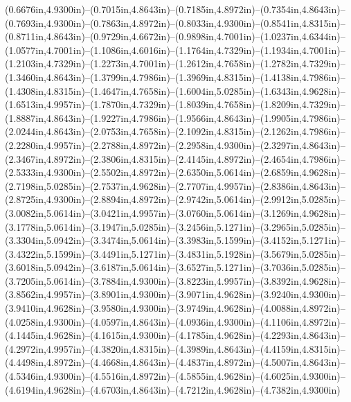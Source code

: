 (0.6676in,4.9300in)--(0.7015in,4.8643in)--(0.7185in,4.8972in)--(0.7354in,4.8643in)--(0.7693in,4.9300in)--(0.7863in,4.8972in)--(0.8033in,4.9300in)--(0.8541in,4.8315in)--(0.8711in,4.8643in)--(0.9729in,4.6672in)--(0.9898in,4.7001in)--(1.0237in,4.6344in)--(1.0577in,4.7001in)--(1.1086in,4.6016in)--(1.1764in,4.7329in)--(1.1934in,4.7001in)--(1.2103in,4.7329in)--(1.2273in,4.7001in)--(1.2612in,4.7658in)--(1.2782in,4.7329in)--(1.3460in,4.8643in)--(1.3799in,4.7986in)--(1.3969in,4.8315in)--(1.4138in,4.7986in)--(1.4308in,4.8315in)--(1.4647in,4.7658in)--(1.6004in,5.0285in)--(1.6343in,4.9628in)--(1.6513in,4.9957in)--(1.7870in,4.7329in)--(1.8039in,4.7658in)--(1.8209in,4.7329in)--(1.8887in,4.8643in)--(1.9227in,4.7986in)--(1.9566in,4.8643in)--(1.9905in,4.7986in)--(2.0244in,4.8643in)--(2.0753in,4.7658in)--(2.1092in,4.8315in)--(2.1262in,4.7986in)--(2.2280in,4.9957in)--(2.2788in,4.8972in)--(2.2958in,4.9300in)--(2.3297in,4.8643in)--(2.3467in,4.8972in)--(2.3806in,4.8315in)--(2.4145in,4.8972in)--(2.4654in,4.7986in)--(2.5333in,4.9300in)--(2.5502in,4.8972in)--(2.6350in,5.0614in)--(2.6859in,4.9628in)--(2.7198in,5.0285in)--(2.7537in,4.9628in)--(2.7707in,4.9957in)--(2.8386in,4.8643in)--(2.8725in,4.9300in)--(2.8894in,4.8972in)--(2.9742in,5.0614in)--(2.9912in,5.0285in)--(3.0082in,5.0614in)--(3.0421in,4.9957in)--(3.0760in,5.0614in)--(3.1269in,4.9628in)--(3.1778in,5.0614in)--(3.1947in,5.0285in)--(3.2456in,5.1271in)--(3.2965in,5.0285in)--(3.3304in,5.0942in)--(3.3474in,5.0614in)--(3.3983in,5.1599in)--(3.4152in,5.1271in)--(3.4322in,5.1599in)--(3.4491in,5.1271in)--(3.4831in,5.1928in)--(3.5679in,5.0285in)--(3.6018in,5.0942in)--(3.6187in,5.0614in)--(3.6527in,5.1271in)--(3.7036in,5.0285in)--(3.7205in,5.0614in)--(3.7884in,4.9300in)--(3.8223in,4.9957in)--(3.8392in,4.9628in)--(3.8562in,4.9957in)--(3.8901in,4.9300in)--(3.9071in,4.9628in)--(3.9240in,4.9300in)--(3.9410in,4.9628in)--(3.9580in,4.9300in)--(3.9749in,4.9628in)--(4.0088in,4.8972in)--(4.0258in,4.9300in)--(4.0597in,4.8643in)--(4.0936in,4.9300in)--(4.1106in,4.8972in)--(4.1445in,4.9628in)--(4.1615in,4.9300in)--(4.1785in,4.9628in)--(4.2293in,4.8643in)--(4.2972in,4.9957in)--(4.3820in,4.8315in)--(4.3989in,4.8643in)--(4.4159in,4.8315in)--(4.4498in,4.8972in)--(4.4668in,4.8643in)--(4.4837in,4.8972in)--(4.5007in,4.8643in)--(4.5346in,4.9300in)--(4.5516in,4.8972in)--(4.5855in,4.9628in)--(4.6025in,4.9300in)--(4.6194in,4.9628in)--(4.6703in,4.8643in)--(4.7212in,4.9628in)--(4.7382in,4.9300in) 